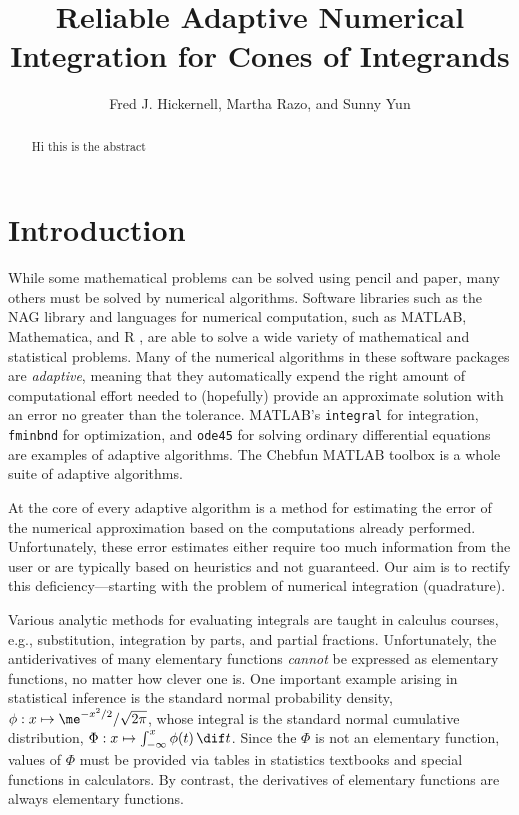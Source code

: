 \documentclass[]{article}
\theoremstyle{definition}
\theoremstyle{remark}
\newcommand{\Matlab}{MATLAB\xspace}
\begin{document}
\title{Reliable Adaptive Numerical Integration for Cones of Integrands}
\author{Fred J. Hickernell, Martha Razo, and Sunny Yun}
\maketitle 


\begin{abstract} Hi this is the abstract
\end{abstract}

\section{Introduction} 

While some mathematical problems can be solved using pencil and paper, many others must be solved by numerical algorithms.  Software libraries such as the NAG library \cite{NAG23} and languages for numerical computation, such as \Matlab \cite{MAT8.4}, Mathematica, \cite{Mat9a} and R \cite{R3.03_2013}, are able to solve a wide variety of mathematical and statistical problems.  Many of the numerical algorithms in these software packages are \emph{adaptive}, meaning that they automatically expend the right amount of computational effort needed to (hopefully) provide an approximate solution with an error no greater than the tolerance. \Matlab's \texttt{integral} for integration, \texttt{fminbnd} for optimization, and \texttt{ode45} for solving ordinary differential equations are examples of adaptive algorithms.  The Chebfun \Matlab toolbox \cite{TrefEtal14} is a whole suite of adaptive algorithms.  

At the core of every adaptive algorithm is a method for estimating the error of the numerical approximation based on the computations already performed.  Unfortunately, these error estimates either require too much information from the user or are typically based on heuristics and not guaranteed. Our aim is to rectify this deficiency---starting with the problem of numerical integration (quadrature).

Various analytic methods for evaluating integrals are taught in calculus courses, e.g., substitution, integration by parts, and partial fractions.  Unfortunately, the antiderivatives of many elementary functions \emph{cannot} be expressed as elementary functions, no matter how clever one is.  One important example arising in statistical inference is the standard normal probability density, $\phi: x \mapsto \me^{-x^2/2}/\sqrt{2 \pi}$, whose integral is the standard normal cumulative distribution, $\Phi : x \mapsto \int_{-\infty}^x \phi(t) \, \dif t$.  Since the $\Phi$ is not an elementary function, values of $\Phi$ must be provided via tables in statistics textbooks and special functions in calculators. By contrast, the derivatives of elementary functions are always elementary functions.  
\end{document}
